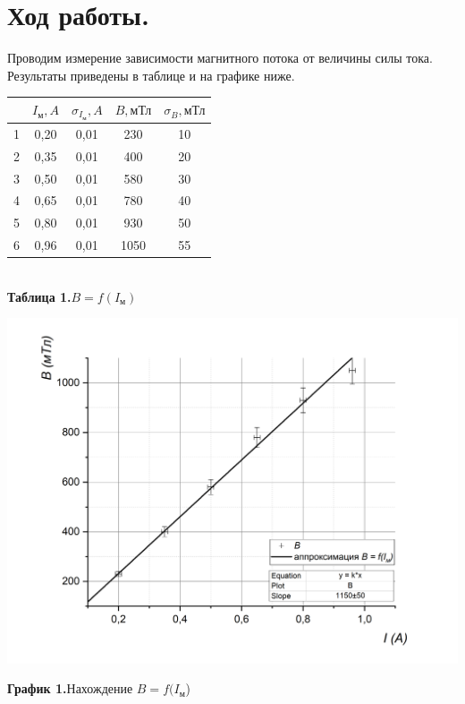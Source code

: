 \documentclass[a4paper, 12pt]{article}%
\begin{document}
\section*{Ход работы.}
Проводим измерение зависимости магнитного потока от величины силы тока. Результаты приведены в таблице и на графике ниже.\\
\begin{center}
\begin{tabular}{|c|c|c|c|c|}
\hline
 & $I_{\text{м}}, A$ & $\sigma_{I_{\text{м}}}, A$ & $B, \text{мТл}$ & $\sigma_{B}, \text{мТл}$ \\ \hline
1 & 0,20 & 0,01 & 230 & 10 \\ \hline
2 & 0,35 & 0,01 & 400 & 20 \\ \hline
3 & 0,50 & 0,01 & 580 & 30 \\ \hline
4 & 0,65 & 0,01 & 780 & 40 \\ \hline
5 & 0,80 & 0,01 & 930 & 50 \\ \hline
6 & 0,96 & 0,01 & 1050 & 55 \\ \hline
\end{tabular}\\
\textbf{Таблица 1.}$B = f(I_{\text{м}})$

\end{center}
\includegraphics[width = \textwidth]{1.jpg}
\begin{center}
\textbf{График 1.}Нахождение $B = f(I_{\text{м}}$)
\end{center}
\end{document}
